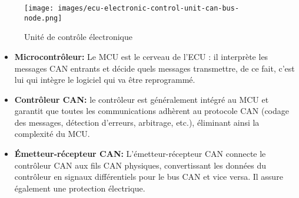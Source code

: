 \documentclass[a4paper, 12pt]{report}
\begin{document}
\begin{figure}[H]
    \centering
   \texttt{[image: images/ecu-electronic-control-unit-can-bus-node.png]}
    \caption{Unité de contrôle électronique}
    \label{fig:ecu}
\end{figure}

\begin{itemize}
    \item \textbf{Microcontrôleur:} Le \acs{MCU} est le cerveau de l'ECU : il interprète les messages CAN entrants et décide quels messages transmettre, de ce fait, c'est lui qui intègre le logiciel qui va être reprogrammé.\\
    
\item \textbf{Contrôleur CAN:} le contrôleur est généralement intégré au MCU et garantit que toutes les communications adhèrent au protocole CAN (codage des messages, détection d'erreurs, arbitrage, etc.), éliminant ainsi la complexité du MCU.\\

\item \textbf{Émetteur-récepteur CAN:} L'émetteur-récepteur CAN connecte le contrôleur CAN aux fils CAN physiques, convertissant les données du contrôleur en signaux différentiels pour le bus CAN et vice versa. Il assure également une protection électrique.

\end{itemize}

\vspace{1cm}
\end{document}
